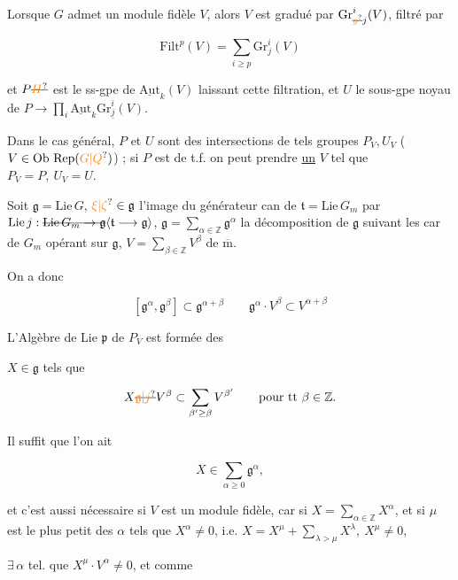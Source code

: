 Lorsque $G$  admet un module fidèle $V$,  alors $V$ est gradué par $\mathrm{Gr}_{\deleted{\unsure{g}}j}^i(V)$, filtré par

\[
\mathrm{Filt}^{p}(V)=\sum_{i\geq p}\mathrm{Gr}_j^i(V)
\]

et $P\deleted{\unsure{H}}$ est le ss-gpe de $\underline{\mathrm{Aut}}_k(V)$ laissant  cette filtration, et $U$ le sous-gpe noyau de $P\longrightarrow\prod_i\underline{\mathrm{Aut}}_k\mathrm{Gr}_{\underline{j}}^i(V)$.

Dans le cas général, $P$ et $U$ sont des intersections de tels groupes $P_V,U_V$ ($V\in\mathrm{Ob}\,\operatorname{Rep}(\unsure{G|Q})$) ; si $P$ est de t.f. on peut prendre \uline{un} $V$ tel que $P_V=P,\ U_V=U$.

 Soit $\mathfrak g=\mathrm{Lie}\,G$, $\unsure{\xi|\zeta}\in\mathfrak g$  l'image du générateur can de $\mathfrak t=\mathrm{Lie}\,G_m$ par $\mathrm{Lie}\,j:\deleted{\mathrm{Lie}\,G_m\to\mathfrak g}\inserted{\mathfrak t\longrightarrow\mathfrak g}$, $\mathfrak g=\sum_{\alpha\in\mathbb Z}\mathfrak g^\alpha$ la décomposition de $\mathfrak g$ suivant les car de $G_m$ opérant sur $\mathfrak g$, $V=\sum_{\beta\in\mathbb Z}V^\beta$ de $\overline{\mathrm m}$.

On a donc

\[
[\mathfrak g^\alpha,\mathfrak g^\beta]\subset\mathfrak g^{\alpha+\beta}
\qquad \mathfrak g^\alpha\cdot V^\beta\subset V^{\alpha+\beta}
\]

L'Algèbre de Lie $\mathfrak p$ de $P_V$ est formée des

$X\in\mathfrak g$ tels que

\[
X\deleted{\unsure{\mathfrak g|j}}V^\beta\subset\sum_{\beta'\geq\beta}V^{\beta'}\qquad\text{pour tt }\beta\in\mathbb Z.
\]

Il suffit que l'on ait

\[
X\in\sum_{\alpha\geq0}\mathfrak g^\alpha,
\]

et c'est aussi nécessaire si $V$ est un module fidèle, car si $X=\sum_{\alpha\in\mathbb Z}X^\alpha$, et si \deleted{$\unsure{\lambda|\alpha}$} $\mu$ est le plus petit des $\alpha$ tels que $X^\alpha\ne0$, i.e. $X=X^\mu+\sum_{\lambda>\mu}X^\lambda,\ X^\mu\ne0$,

 $\exists\,\alpha$ tel. que $X^\mu\cdot V^\alpha\ne0$,  et comme

